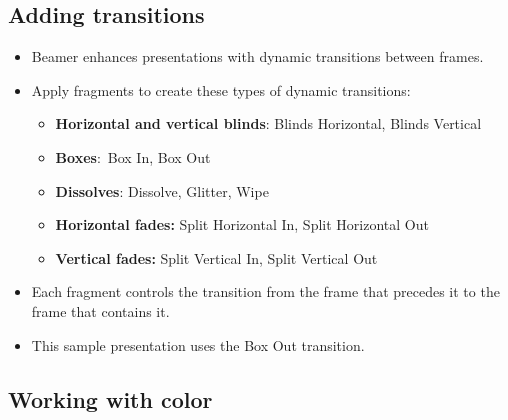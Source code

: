 \documentclass[notes=show,beamer]{beamer}
\newenvironment{stepitemize}{\begin{itemize}[<+->]}{\end{itemize} }
\begin{document}
\subsection{Adding transitions}

\begin{frame}%


\begin{stepitemize}
\item Beamer enhances presentations with dynamic transitions between frames.

\item Apply fragments to create these types of dynamic transitions:

\begin{stepitemize}
\item \textbf{Horizontal and vertical blinds}: Blinds Horizontal, Blinds
Vertical

\item \textbf{Boxes}:\ Box In, Box Out

\item \textbf{Dissolves}: Dissolve, Glitter, Wipe

\item \textbf{Horizontal fades:} Split Horizontal In, Split Horizontal Out

\item \textbf{Vertical fades: }Split Vertical In, Split Vertical Out
\end{stepitemize}

\item Each fragment controls the transition from the frame that precedes it
to the frame that contains it.

\item This sample presentation uses the Box Out transition.
\end{stepitemize}

\transboxout%
\end{frame}%

\subsection{Working with color}
\end{document}
